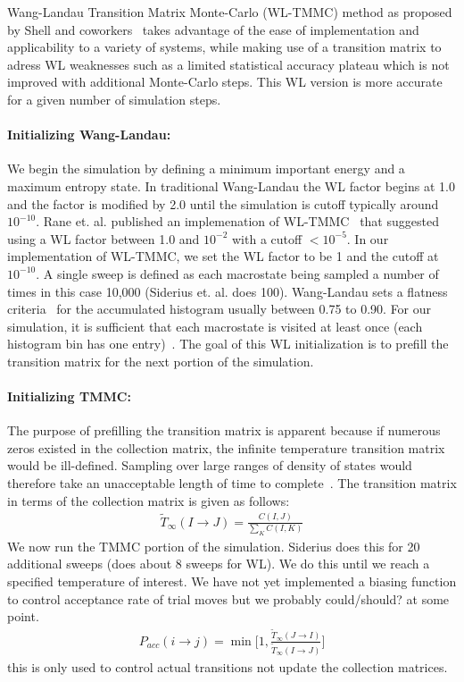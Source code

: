 \documentclass[letterpaper,twocolumn,amsmath,amssymb,pre,aps,10pt]{revtex4-1}
\begin{document}
Wang-Landau Transition Matrix Monte-Carlo (WL-TMMC) method as proposed 
by Shell and coworkers~\cite{shell2003improved,shell2004flat} takes 
advantage of the ease of implementation and applicability to a variety 
of systems, while making use of a transition matrix to adress WL 
weaknesses such as a limited statistical accuracy plateau which is not 
improved with additional Monte-Carlo steps.  This WL version is more 
accurate for a given number of simulation steps.

\paragraph{Initializing Wang-Landau:} We begin the simulation by 
defining a minimum important energy and a maximum entropy state. In 
traditional Wang-Landau the WL factor begins at 1.0 and the factor is 
modified by 2.0 until the simulation is cutoff typically around 
$10^{-10}$.  Rane et. al. published an implemenation of 
WL-TMMC~\cite{rane2013monte} that suggested using a WL factor between 1.0 and 
$10^{-2}$ with a cutoff $<10^{-5}$. In our implementation of WL-TMMC, 
we set the WL factor to be 1 and the cutoff at $10^{-10}$. A single 
sweep is defined as each macrostate being sampled a number of times in 
this case 10,000 (Siderius et. al. does 100). Wang-Landau sets a 
flatness criteria~\cite{wang2001determining, wang2001efficient, 
hatch2015computational, mahynski2017predicting} for the accumulated 
histogram usually between 0.75 to 0.90.  For our simulation, it is 
sufficient that each macrostate is visited at least once (each 
histogram bin has one entry)~\cite{shell2003improved}.  The goal of 
this WL initialization is to prefill the transition matrix for the next 
portion of the simulation. 
\paragraph{Initializing TMMC:} The purpose of prefilling the transition 
matrix is apparent because if numerous zeros existed in the collection 
matrix, the infinite temperature transition matrix would be 
ill-defined.  Sampling over large ranges of density of states would 
therefore take an unacceptable length of time to 
complete~\cite{shell2003improved, shen2014elucidating}.  The transition 
matrix in terms of the collection matrix is given as follows:
\begin{align}
\widetilde{T}_{\infty}(I\rightarrow J) = \frac{C(I,J)}
{\sum_{K} C(I,K)}
\end{align}
We now run the TMMC portion of the simulation.  Siderius does this for
20 additional sweeps (does about 8 sweeps for WL).  We do this until we
reach a specified temperature of interest.
We have not yet implemented a biasing function to control acceptance
rate of trial moves but we probably could/should? at some point.
\begin{align}
  P_{acc}(i\rightarrow j) = \min\bigg[1,\frac{\widetilde{T}_{\infty}(J\rightarrow I)}
  {\widetilde{T}_{\infty}(I\rightarrow J)}\bigg]
\end{align}
this is only used to control actual transitions not update the collection
matrices.
\end{document}
